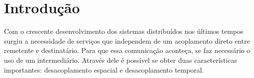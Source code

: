 \documentclass[
	12pt,				%
    oneside,			%
	a4paper,			%
	english,			%
	brazil,				%
	]{abntex2}
\begin{document}







\tableofcontents*


\textual

\chapter{Introdução} 

Com o crescente desenvolvimento dos sistemas distribuídos nos últimos tempos surgiu a necessidade de serviços que independem de um acoplamento direto entre remetente e destinatário. Para que essa comunicação aconteça, se faz necessário o uso de um intermediário. Através dele é possível se obter duas características importantes: desacoplamento espacial e desacoplamento temporal.
\end{document}

